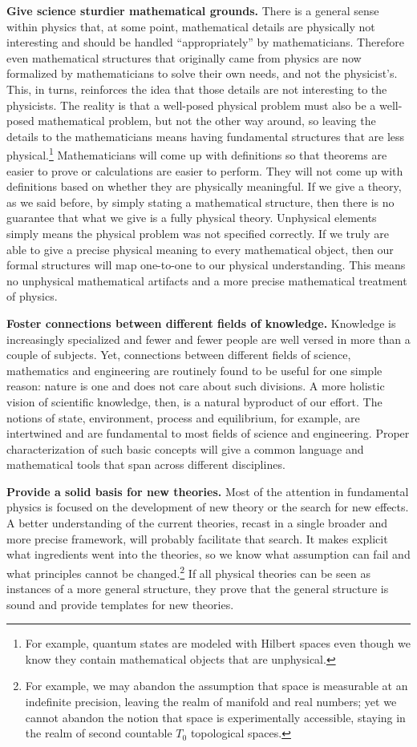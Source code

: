 \documentclass[twocolumn]{article}
\begin{document}
\textbf{Give science sturdier mathematical grounds.} There is a general sense within physics that, at some point, mathematical details are physically not interesting and should be handled ``appropriately'' by mathematicians. Therefore even mathematical structures that originally came from physics are now formalized by mathematicians to solve their own needs, and not the physicist's. This, in turns, reinforces the idea that those details are not interesting to the physicists. The reality is that a well-posed physical problem must also be a well-posed mathematical problem, but not the other way around, so leaving the details to the mathematicians means having fundamental structures that are less physical.\footnote{For example, quantum states are modeled with Hilbert spaces even though we know they contain mathematical objects that are unphysical.} Mathematicians will come up with definitions so that theorems are easier to prove or calculations are easier to perform. They will not come up with definitions based on whether they are physically meaningful. If we give a theory, as we said before, by simply stating a mathematical structure, then there is no guarantee that what we give is a fully physical theory. Unphysical elements simply means the physical problem was not specified correctly. If we truly are able to give a precise physical meaning to every mathematical object, then our formal structures will map one-to-one to our physical understanding. This means no unphysical mathematical artifacts and a more precise mathematical treatment of physics.

\textbf{Foster connections between different fields of knowledge.} Knowledge is increasingly specialized and fewer and fewer people are well versed in more than a couple of subjects. Yet, connections between different fields of science, mathematics and engineering are routinely found to be useful for one simple reason: nature is one and does not care about such divisions. A more holistic vision of scientific knowledge, then, is a natural byproduct of our effort. The notions of state, environment, process and equilibrium, for example, are intertwined and are fundamental to most fields of science and engineering. Proper characterization of such basic concepts will give a common language and mathematical tools that span across different disciplines.

\textbf{Provide a solid basis for new theories.} Most of the attention in fundamental physics is focused on the development of new theory or the search for new effects. A better understanding of the current theories, recast in a single broader and more precise framework, will probably facilitate that search. It makes explicit what ingredients went into the theories, so we know what assumption can fail and what principles cannot be changed.\footnote{For example, we may abandon the assumption that space is measurable at an indefinite precision, leaving the realm of manifold and real numbers; yet we cannot abandon the notion that space is experimentally accessible, staying in the realm of second countable $T_0$ topological spaces.} If all physical theories can be seen as instances of a more general structure, they prove that the general structure is sound and provide templates for new theories.
\end{document}
